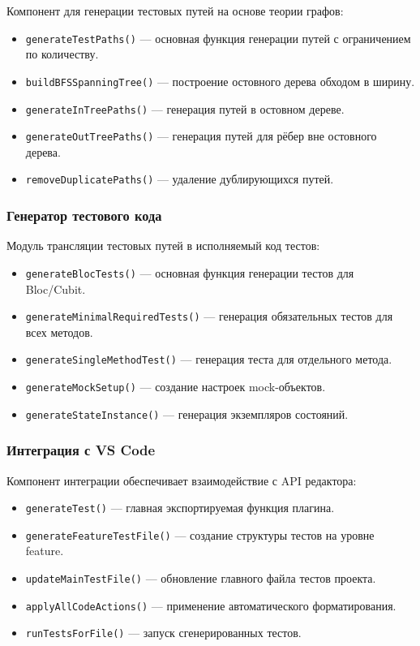 \documentclass[14pt, russian]{scrartcl}
\begin{document}
Компонент для генерации тестовых путей на основе теории графов:

\begin{itemize}
    \item \texttt{generateTestPaths()} — основная функция генерации путей с ограничением по количеству.
    \item \texttt{buildBFSSpanningTree()} — построение остовного дерева обходом в ширину.
    \item \texttt{generateInTreePaths()} — генерация путей в остовном дереве.
    \item \texttt{generateOutTreePaths()} — генерация путей для рёбер вне остовного дерева.
    \item \texttt{removeDuplicatePaths()} — удаление дублирующихся путей.
\end{itemize}

\subsubsection{Генератор тестового кода}

Модуль трансляции тестовых путей в исполняемый код тестов:

\begin{itemize}
    \item \texttt{generateBlocTests()} — основная функция генерации тестов для Bloc/Cubit.
    \item \texttt{generateMinimalRequiredTests()} — генерация обязательных тестов для всех методов.
    \item \texttt{generateSingleMethodTest()} — генерация теста для отдельного метода.
    \item \texttt{generateMockSetup()} — создание настроек mock-объектов.
    \item \texttt{generateStateInstance()} — генерация экземпляров состояний.
\end{itemize}

\subsubsection{Интеграция с VS Code}

Компонент интеграции обеспечивает взаимодействие с API редактора:

\begin{itemize}
    \item \texttt{generateTest()} — главная экспортируемая функция плагина.
    \item \texttt{generateFeatureTestFile()} — создание структуры тестов на уровне feature.
    \item \texttt{updateMainTestFile()} — обновление главного файла тестов проекта.
    \item \texttt{applyAllCodeActions()} — применение автоматического форматирования.
    \item \texttt{runTestsForFile()} — запуск сгенерированных тестов.
\end{itemize}
\end{document}
